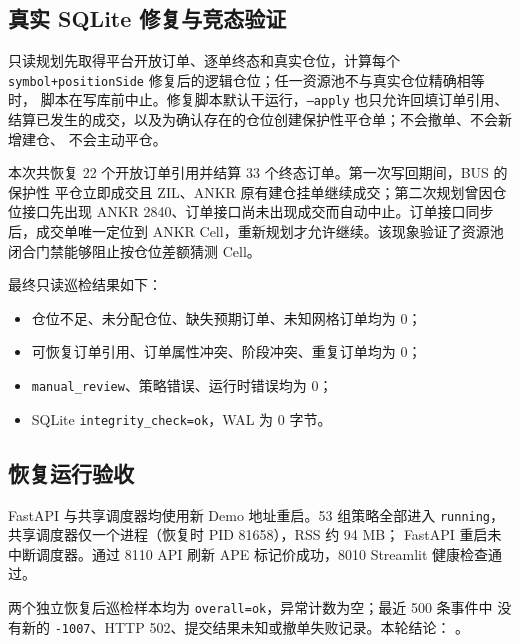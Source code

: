 \subsection{真实 SQLite 修复与竞态验证}

只读规划先取得平台开放订单、逐单终态和真实仓位，计算每个
\texttt{symbol+positionSide} 修复后的逻辑仓位；任一资源池不与真实仓位精确相等时，
脚本在写库前中止。修复脚本默认干运行，\texttt{--apply} 也只允许回填订单引用、
结算已发生的成交，以及为确认存在的仓位创建保护性平仓单；不会撤单、不会新增建仓、
不会主动平仓。

本次共恢复 22 个开放订单引用并结算 33 个终态订单。第一次写回期间，BUS 的保护性
平仓立即成交且 ZIL、ANKR 原有建仓挂单继续成交；第二次规划曾因仓位接口先出现
ANKR 2840、订单接口尚未出现成交而自动中止。订单接口同步后，成交单唯一定位到
ANKR Cell，重新规划才允许继续。该现象验证了资源池闭合门禁能够阻止按仓位差额猜测
Cell。

最终只读巡检结果如下：

\begin{itemize}
  \item 仓位不足、未分配仓位、缺失预期订单、未知网格订单均为 0；
  \item 可恢复订单引用、订单属性冲突、阶段冲突、重复订单均为 0；
  \item \texttt{manual\_review}、策略错误、运行时错误均为 0；
  \item SQLite \texttt{integrity\_check=ok}，WAL 为 0 字节。
\end{itemize}

\subsection{恢复运行验收}

FastAPI 与共享调度器均使用新 Demo 地址重启。53 组策略全部进入
\texttt{running}，共享调度器仅一个进程（恢复时 PID 81658），RSS 约 94 MB；
FastAPI 重启未中断调度器。通过 8110 API 刷新 APE 标记价成功，8010 Streamlit
健康检查通过。

两个独立恢复后巡检样本均为 \texttt{overall=ok}，异常计数为空；最近 500 条事件中
没有新的 \texttt{-1007}、HTTP 502、提交结果未知或撤单失败记录。本轮结论：
\StatusPass。
